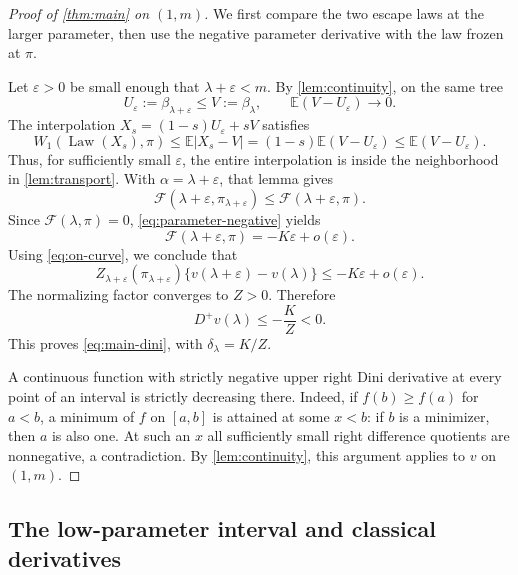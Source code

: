 \documentclass[11pt,a4paper]{article}
\numberwithin{equation}{section}
\theoremstyle{notethm}
\theoremstyle{definition}
\newcommand{\E}{\mathbb E}
\newcommand{\Law}{\operatorname{Law}}
\newcommand{\Dplus}{D^{+}}
\newcommand{\cF}{\mathscr F}
\begin{document}
\begin{proof}[Proof of \cref{thm:main} on $(1,m)$]
We first compare the two escape laws at the larger parameter, then use
the negative parameter derivative with the law frozen at $\pi$.

Let $\varepsilon>0$ be small enough that $\lambda+\varepsilon<m$.
By \cref{lem:continuity}, on the same tree
\[
 U_\varepsilon:=\beta_{\lambda+\varepsilon}\le
 V:=\beta_\lambda,
 \qquad \E(V-U_\varepsilon)\longrightarrow0.
\]
The interpolation $X_s=(1-s)U_\varepsilon+sV$ satisfies
\begin{equation}\label{eq:interpolation-ball}
 W_1(\Law(X_s),\pi)
 \le\E|X_s-V|
 =(1-s)\E(V-U_\varepsilon)
 \le\E(V-U_\varepsilon).
\end{equation}
Thus, for sufficiently small $\varepsilon$, the entire interpolation is
inside the neighborhood in \cref{lem:transport}. With
$\alpha=\lambda+\varepsilon$, that lemma gives
\begin{equation}\label{eq:law-comparison}
 \cF(\lambda+\varepsilon,\pi_{\lambda+\varepsilon})
 \le\cF(\lambda+\varepsilon,\pi).
\end{equation}
Since $\cF(\lambda,\pi)=0$, \eqref{eq:parameter-negative} yields
\[
 \cF(\lambda+\varepsilon,\pi)=-K\varepsilon+o(\varepsilon).
\]
Using \eqref{eq:on-curve}, we conclude that
\begin{equation}\label{eq:finite-comparison}
 Z_{\lambda+\varepsilon}(\pi_{\lambda+\varepsilon})
 \{v(\lambda+\varepsilon)-v(\lambda)\}
 \le-K\varepsilon+o(\varepsilon).
\end{equation}
The normalizing factor converges to $Z>0$. Therefore
\begin{equation}\label{eq:explicit-dini}
 \boxed{\quad \Dplus v(\lambda)\le-\frac KZ<0.\quad}
\end{equation}
This proves \eqref{eq:main-dini}, with $\delta_\lambda=K/Z$.

A continuous function with strictly negative upper right Dini derivative at
every point of an interval is strictly decreasing there. Indeed, if
$f(b)\ge f(a)$ for $a<b$, a minimum of $f$ on $[a,b]$ is attained at some
$x<b$: if $b$ is a minimizer, then $a$ is also one. At such an $x$ all
sufficiently small right difference quotients are nonnegative, a
contradiction. By \cref{lem:continuity}, this argument applies to $v$ on
$(1,m)$.
\end{proof}

\subsection{The low-parameter interval and classical derivatives}
\end{document}
